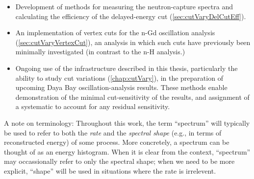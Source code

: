 \documentclass[../thesis.tex]{subfiles}
\begin{document}
\begin{itemize}
  \item Development of methods for measuring the neutron-capture spectra and calculating the efficiency of the delayed-energy cut (\autoref{sec:cutVaryDelCutEff}).
  \item An implementation of vertex cuts for the n-Gd oscillation analysis (\autoref{sec:cutVaryVertexCut}), an analysis in which such cuts have previously been minimally investigated (in contrast to the n-H analysis.)
  \item Ongoing use of the infrastructure described in this thesis, particularly the ability to study cut variations (\autoref{chap:cutVary}), in the preparation of upcoming Daya Bay oscillation-analysis results. These methods enable demonstration of the minimal cut-sensitivity of the results, and assignment of a systematic to account for any residual sensitivity.
\end{itemize}

A note on terminology: Throughout this work, the term ``spectrum'' will typically be used to refer to both the \emph{rate} and the \emph{spectral shape} (e.g., in terms of reconstructed energy) of some process. More concretely, a spectrum can be thought of as an energy histogram. When it is clear from the context, ``spectrum'' may occassionally refer to only the spectral shape; when we need to be more explicit, ``shape'' will be used in situations where the rate is irrelevent.
\end{document}

